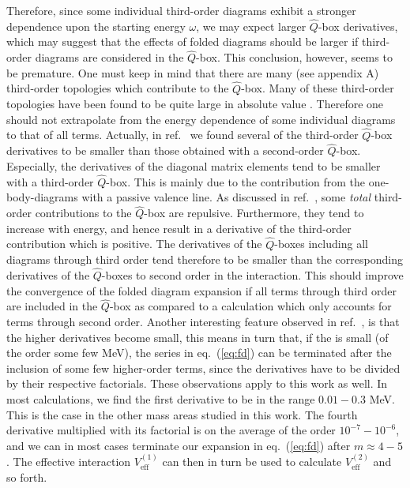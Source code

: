 Therefore, since some individual third-order diagrams exhibit a
stronger dependence
upon the starting energy $\omega$, we may expect larger
$\hat{Q}$-box derivatives, which may suggest that the effects of
folded
diagrams should be larger if third-order diagrams are considered
in the $\hat{Q}$-box.
This conclusion, however, seems to be premature. One must keep
in mind that there are many
(see appendix A) third-order topologies which
contribute to the $\hat{Q}$-box. Many of these third-order
topologies have been found to be quite large in absolute value
\cite{hom92,bk70}. Therefore one should not extrapolate
from
the energy
dependence of some individual diagrams to that of all terms.
Actually, in ref.\ \cite{hom92}
we found several of the third-order
$\hat{Q}$-box derivatives to be smaller than those obtained with
a second-order $\hat{Q}$-box. Especially, the derivatives of the
diagonal matrix elements tend to be smaller with a third-order
$\hat{Q}$-box. This is mainly due to the contribution
from the one-body-diagrams with  a passive valence line.
As discussed in ref.\ \cite{hom92},
some {\em total} third-order contributions to the $\hat Q$-box are
repulsive. Furthermore, they tend to increase with energy, and hence
result in a derivative of the third-order contribution which is positive.
The derivatives of the $\hat{Q}$-boxes including all diagrams through
third order tend therefore
to be smaller than the corresponding derivatives of
the $\hat{Q}$-boxes
to second order in the interaction. This
should improve
the convergence of the folded diagram expansion if all terms
through third order
are included in the $\hat Q$-box as compared to a calculation
which only
accounts for terms through second order.
Another interesting feature observed in ref.\ \cite{hom92}, is that the
higher derivatives become small, this means in turn that, if the \qbox is
small (of the order some few MeV), the series in eq.\ (\ref{eq:fd}) can
be terminated after the inclusion of some few higher-order terms, since
the derivatives have to be divided by their respective factorials.
These observations apply to this work as well.
In most calculations, we find the first derivative to be in the range
$0.01-0.3$ MeV. This is the case in  the other mass areas studied
in this work. The fourth derivative multiplied with its factorial
is on the average of  the order $10^{-7}-10^{-6}$, and we can in most cases
terminate our expansion in eq.\ (\ref{eq:fd}) after  $m\approx 4-5$.
The effective interaction
$V_{\mathrm{eff}}^{(1)}$
can then in turn be used to calculate $V_{\mathrm{eff}}^{(2)}$ and so forth.
